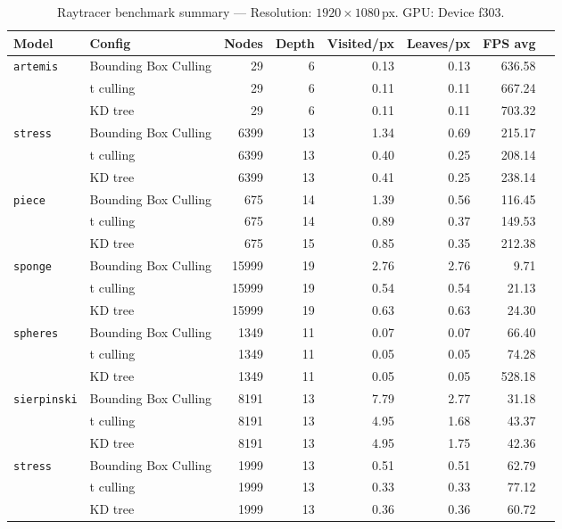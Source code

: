 
\begin{table}[htbp]
  \centering\small
  \setlength{\tabcolsep}{4pt}
  \caption{Raytracer benchmark summary --- Resolution: $1920\times1080$\,px. GPU: Device f303.}
  \label{tab:rt-summary}
  \begin{tabular}{@{}llrrrrrr@{}}
    \toprule
    \textbf{Model} & \textbf{Config} & \textbf{Nodes} & \textbf{Depth} & \textbf{Visited/px} & \textbf{Leaves/px} & \textbf{FPS avg} \\
    \midrule
    \multirow{3}{*}{\texttt{artemis}} & Bounding Box Culling & 29 & 6 & 0.13 & 0.13 & 636.58 \\
     & t culling & 29 & 6 & 0.11 & 0.11 & 667.24 \\
     & KD tree & 29 & 6 & 0.11 & 0.11 & 703.32 \\
    \midrule
    \multirow{3}{*}{\texttt{stress}} & Bounding Box Culling & 6399 & 13 & 1.34 & 0.69 & 215.17 \\
     & t culling & 6399 & 13 & 0.40 & 0.25 & 208.14 \\
     & KD tree & 6399 & 13 & 0.41 & 0.25 & 238.14 \\
    \midrule
    \multirow{3}{*}{\texttt{piece}} & Bounding Box Culling & 675 & 14 & 1.39 & 0.56 & 116.45 \\
     & t culling & 675 & 14 & 0.89 & 0.37 & 149.53 \\
     & KD tree & 675 & 15 & 0.85 & 0.35 & 212.38 \\
    \midrule
    \multirow{3}{*}{\texttt{sponge}} & Bounding Box Culling & 15999 & 19 & 2.76 & 2.76 & 9.71 \\
     & t culling & 15999 & 19 & 0.54 & 0.54 & 21.13 \\
     & KD tree & 15999 & 19 & 0.63 & 0.63 & 24.30 \\
    \midrule
    \multirow{3}{*}{\texttt{spheres}} & Bounding Box Culling & 1349 & 11 & 0.07 & 0.07 & 66.40 \\
     & t culling & 1349 & 11 & 0.05 & 0.05 & 74.28 \\
     & KD tree & 1349 & 11 & 0.05 & 0.05 & 528.18 \\
    \midrule
    \multirow{3}{*}{\texttt{sierpinski}} & Bounding Box Culling & 8191 & 13 & 7.79 & 2.77 & 31.18 \\
     & t culling & 8191 & 13 & 4.95 & 1.68 & 43.37 \\
     & KD tree & 8191 & 13 & 4.95 & 1.75 & 42.36 \\
    \midrule
    \multirow{3}{*}{\texttt{stress}} & Bounding Box Culling & 1999 & 13 & 0.51 & 0.51 & 62.79 \\
     & t culling & 1999 & 13 & 0.33 & 0.33 & 77.12 \\
     & KD tree & 1999 & 13 & 0.36 & 0.36 & 60.72 \\
    \bottomrule
  \end{tabular}
\end{table}
